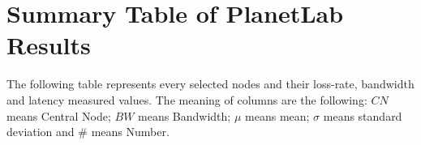 \chapter{Summary Table of PlanetLab Results}

The following table represents every selected nodes and their loss-rate,
bandwidth and latency measured values. The meaning of columns are the following:
$CN$ means Central Node; $BW$ means Bandwidth; $\mu$ means mean; $\sigma$ means
standard deviation and $\#$ means Number.


\begin{landscape}
%   
 
\end{landscape}
